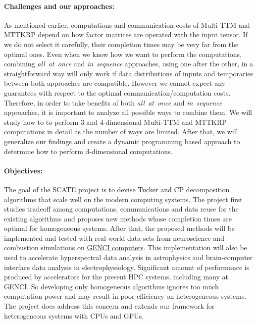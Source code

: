 \documentclass[a4paper,11pt]{article}
\begin{document}
    \vspace*{-0.25cm}\paragraph{Challenges and our approaches:} As mentioned earlier, computations and communication costs of Multi-TTM and MTTKRP depend on how factor matrices are operated with the input tensor. If we do not select it carefully, their completion times may be very far from the optimal ones. Even when we know how we want to perform the computations, combining \emph{all~at~once} and \emph{in~sequence} approaches, using one after the other, in a straightforward way will only work if data distributions of inputs and temporaries between both approaches are compatible. However we cannot expect any guarantees with respect to the optimal communication/computation costs. Therefore, in order to take benefits of both \emph{all~at~once} and \emph{in~sequence} approaches, it is important to analyze all possible ways to combine them. We will study how to to perform 3 and 4-dimensional Multi-TTM and MTTKRP computations in detail as the number of ways are limited. After that, we will generalize our findings and create a dynamic programming based approach to determine how to perform d-dimensional computations.
    
   	\vspace*{-0.25cm}\paragraph{Objectives:} The goal of the SCATE project is to devise Tucker and CP decomposition algorithms that scale well on the modern computing systems. The project first studies tradeoff among computations, communications and data reuse for the existing algorithms and proposes new methods whose completion times are optimal for homogeneous systems. After that, the proposed methods will be implemented and tested with real-world data-sets from neuroscience and combustion simulations on \href{https://www.genci.fr/en/our-computers}{GENCI computers}. This implementation will also be used to accelerate hyperspectral data analysis in astrophysics and brain-computer interface data analysis in electrophysiology. Significant amount of performance is produced by accelerators for the present HPC systems, including many at GENCI. So developing only homogeneous algorithms ignores too much computation power and may result in poor efficiency on heterogeneous systems. The project does address this concern and extends our framework for heterogeneous systems with CPUs and GPUs.
\end{document}
